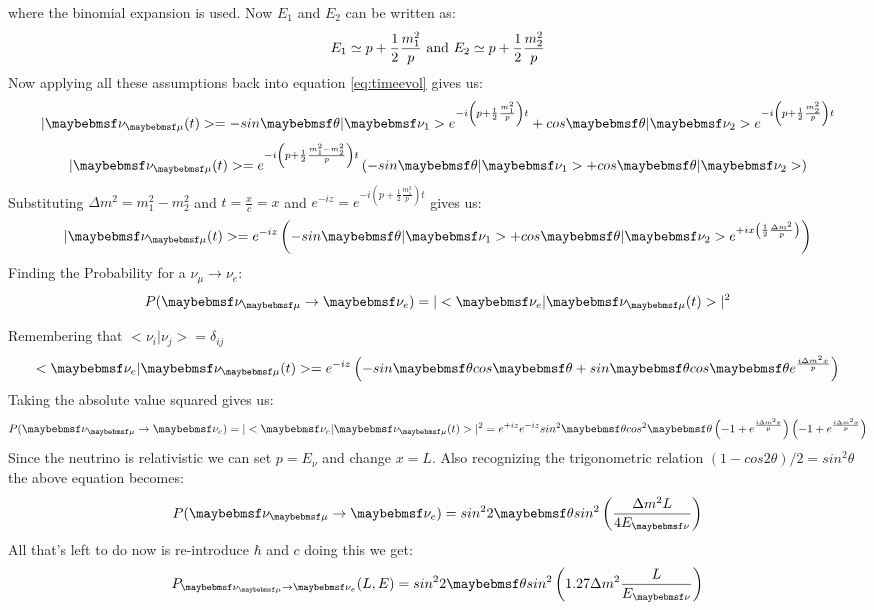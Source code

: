 where the binomial expansion is used. Now $E_{1}$ and $E_{2}$ can be written as:
\begin{equation}
\centering
E_{1} \simeq p + \frac{1}{2}\frac{m^2_{1}}{p} \mbox{    and    }  E_{2} \simeq p + \frac{1}{2}\frac{m^2_{2}}{p}
\end{equation} 
Now applying all these assumptions back into equation \ref{eq:timeevol} gives us:
\begin{equation}
\centering
|\nu_{\mu}(t)> = -sin\theta|\nu_{1}>e^{-i\left( p+\frac{1}{2}\frac{m^2_{1}}{p}\right)t} + cos\theta|\nu_{2}>e^{-i\left(p+\frac{1}{2}\frac{m^2_{2}}{p}\right)t}
\end{equation}
\begin{equation}
\centering
|\nu_{\mu}(t)> = e^{-i \left( p+\frac{1}{2}\frac{m^2_{1}-m^2_{2}}{p} \right) t} \left( -sin\theta|\nu_{1}> + cos\theta|\nu_{2}> \right)
\end{equation}
Substituting $\Delta m^2 = m^2_{1}-m^2_{2}$ and $t = \frac{x}{c} =x$ and $e^{-iz}= e^{-i \left( p+\frac{1}{2}\frac{m^2_{1}}{p} \right) t}$ gives us:
 \begin{equation}
 \centering
 |\nu_{\mu}(t)> = e^{-iz} \left( -sin\theta|\nu_{1}> + cos\theta|\nu_{2}>e^{+ix \left(\frac{1}{2}\frac{\Delta m^2}{p}\right)}\right)
 \end{equation}
Finding the Probability for a $\nu_{\mu} \rightarrow \nu_{e}$:
\begin{equation}
\centering
P(\nu_{\mu} \rightarrow \nu_{e}) = |<\nu_{e}|\nu_{\mu}(t)>|^2
\end{equation}

Remembering that $<\nu_{i}|\nu_{j}>=\delta_{ij}$
\begin{equation}
\centering
<\nu_{e}|\nu_{\mu}(t)> = e^{-iz}\left(-sin\theta cos\theta + sin\theta cos\theta e^{\frac{i \Delta m^2 x}{p}}\right)
\end{equation}
Taking the absolute value squared gives us:
\begin{equation}
\centering
P(\nu_{\mu} \rightarrow \nu_{e}) = |<\nu_{e}|\nu_{\mu}(t)>|^2 = e^{+iz}e^{-iz}sin^{2}\theta cos^{2}\theta\left( -1 + e^{\frac{i \Delta m^2 x}{p}}\right)\left(-1 + e^{\frac{i \Delta m^2 x}{p}}\right)
\end{equation}
Since the neutrino is relativistic we can set $p= E_{\nu}$ and change $x=L$. Also recognizing the trigonometric relation $(1 - cos2\theta)/2 = sin^{2}\theta$ the above equation becomes:
\begin{equation}
\centering
P(\nu_{\mu} \rightarrow \nu_{e}) = sin^{2}2\theta sin^2\left(\frac{\Delta m^2 L}{4 E_{\nu}}\right)
\end{equation}
All that's left to do now is re-introduce $\hbar$ and $c$ doing this we get:
 \begin{equation}
 \centering
 P_{\nu_{\mu} \rightarrow \nu_{e}} (L,E) = sin^{2}2\theta sin^2\left(1.27 \Delta m^2 \frac{L}{E_{\nu}}\right)
 \end{equation}
 
